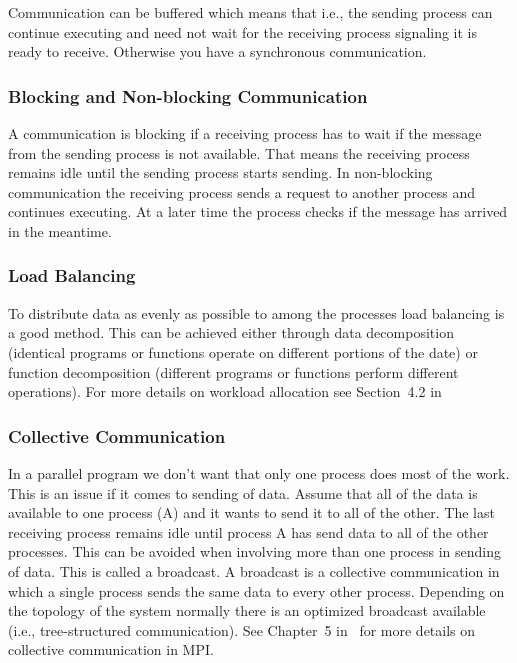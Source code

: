 Communication can be buffered which means that i.e., the sending
process can continue executing and need not wait for the receiving
process signaling it is ready to receive. Otherwise you have a synchronous
communication. 

\subsubsection{Blocking and Non-blocking Communication}

A communication is blocking if a receiving process has to wait if the
message from the sending process is not available. That means the
receiving process remains idle until the sending process starts
sending. In non-blocking communication the receiving process sends a
request to another process and continues executing. At a later time
the process checks if the message has arrived in the meantime. 

\subsubsection{Load Balancing}

To distribute data as evenly as possible to among the processes load
balancing is a good method. This can be achieved either through data
decomposition (identical programs or functions operate on different
portions of the date) or function decomposition (different programs or
functions perform different operations). For more details on workload
allocation see Section~4.2 in~\cite{geist94pvm} 

\subsubsection{Collective Communication}

In a parallel program we don't want that only one process does most of
the work. This is an issue if it comes to sending of data. Assume that
all of the data is available to one process (A) and it wants to send it to
all of the other. The last receiving process remains idle until
process A has send data to all of the other processes. This can be
avoided when involving more than one process in sending of data. This
is called a broadcast.
A broadcast is a collective communication in which a single process
sends the same data to every other process. Depending on the topology
of the system normally there is an optimized broadcast available
(i.e., tree-structured communication). See Chapter~5
in~\cite{pacheco97mpi} for more details on collective communication in
MPI.

